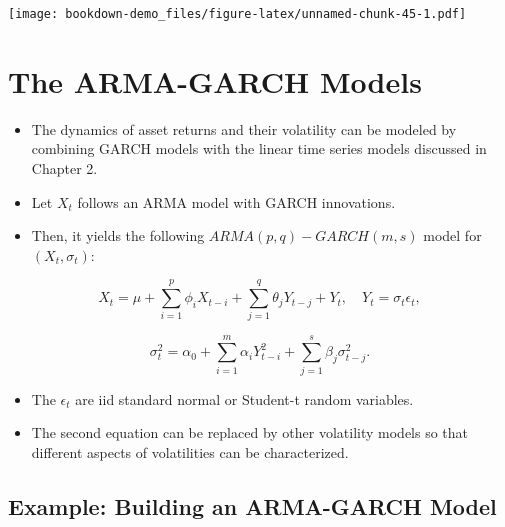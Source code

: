 \documentclass[]{book}
\newenvironment{Shaded}{\begin{snugshade}}{\end{snugshade}}
\newcommand{\CommentTok}[1]{\textcolor[rgb]{0.56,0.35,0.01}{\textit{#1}}}
\newcommand{\DataTypeTok}[1]{\textcolor[rgb]{0.13,0.29,0.53}{#1}}
\newcommand{\DecValTok}[1]{\textcolor[rgb]{0.00,0.00,0.81}{#1}}
\newcommand{\KeywordTok}[1]{\textcolor[rgb]{0.13,0.29,0.53}{\textbf{#1}}}
\newcommand{\NormalTok}[1]{#1}
\newcommand{\OtherTok}[1]{\textcolor[rgb]{0.56,0.35,0.01}{#1}}
\providecommand{\tightlist}{%
  \setlength{\itemsep}{0pt}\setlength{\parskip}{0pt}}
\begin{document}
\begin{Shaded}
\end{Shaded}

\texttt{[image: bookdown-demo\_files/figure-latex/unnamed-chunk-45-1.pdf]}

\hypertarget{the-arma-garch-models}{%
\section{The ARMA-GARCH Models}\label{the-arma-garch-models}}

\begin{itemize}
\tightlist
\item
  The dynamics of asset returns and their volatility can be modeled by combining GARCH models with the linear time series models discussed in Chapter 2.
\item
  Let \(X_t\) follows an ARMA model with GARCH innovations.
\item
  Then, it yields the following \(ARMA(p,q)-GARCH(m,s)\) model for \((X_t, \sigma_t):\)
\end{itemize}

\[X_t=\mu+\sum_{i=1}^p\phi_iX_{t-i}+\sum_{j=1}^q\theta_jY_{t-j} + Y_t, \quad Y_t=\sigma_t\epsilon_t,\]

\[\sigma^2_t=\alpha_0+
\sum_{i=1}^m\alpha_iY_{t-i}^2+\sum_{j=1}^s\beta_j\sigma_{t-j}^2.\]

\begin{itemize}
\tightlist
\item
  The \(\epsilon_t\) are iid standard normal or Student-t random variables.
\item
  The second equation can be replaced by other volatility models so that different aspects of volatilities can be characterized.
\end{itemize}

\hypertarget{example-building-an-arma-garch-model}{%
\subsection{Example: Building an ARMA-GARCH Model}\label{example-building-an-arma-garch-model}}
\end{document}
